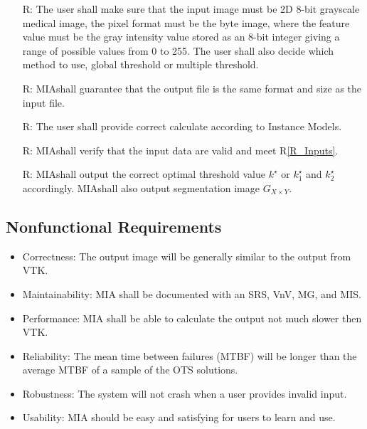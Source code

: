 \documentclass[12pt]{article}
\newcounter{reqnum} %
\newcommand{\rref}[1]{R\ref{#1}}
\newcommand{\famname}{MIA} %
\begin{document}
\noindent \begin{itemize}

\item[R\refstepcounter{reqnum}\thereqnum \label{R_Inputs}:] 
The user shall make sure that the input image must be 2D 8-bit grayscale medical image, the pixel format must be the byte image, where the feature value must be the gray intensity value stored as an 8-bit integer giving a range of possible values from 0 to 255. The user shall also decide which method to use, global threshold or multiple threshold.

\item[R\refstepcounter{reqnum}\thereqnum \label{R_OutputInputs}:] 
\famname shall guarantee that the output file is the same format and size as the input file.

\item[R\refstepcounter{reqnum}\thereqnum \label{R_Calculate}:]
The user shall provide correct calculate according to Instance Models.

\item[R\refstepcounter{reqnum}\thereqnum \label{R_VerifyOutput}:]
\famname shall verify that the input data are valid and meet \rref{R_Inputs}. 

\item[R\refstepcounter{reqnum}\thereqnum \label{R_Outputk}:] 
\famname shall output the correct optimal threshold value $k^{\star}$ or $k^{\star}_{1}$ and $k^{\star}_{2}$ accordingly. \famname shall also output segmentation image $G_{X \times Y}$.

\end{itemize}

\subsection{Nonfunctional Requirements}

\begin{itemize}
\item Correctness: The output image will be generally similar to the output from VTK.
\item Maintainability: \famname{} shall be documented with an SRS, VnV, MG, and MIS.
\item Performance: \famname{} shall be able to calculate the output not much slower then VTK.
\item Reliability: The mean time between failures (MTBF) will be longer than the average MTBF of a sample of the OTS solutions.
\item Robustness: The system will not crash when a user provides invalid input.
\item Usability: \famname{} should be easy and satisfying for users to learn and use.
\end{itemize}
\end{document}
